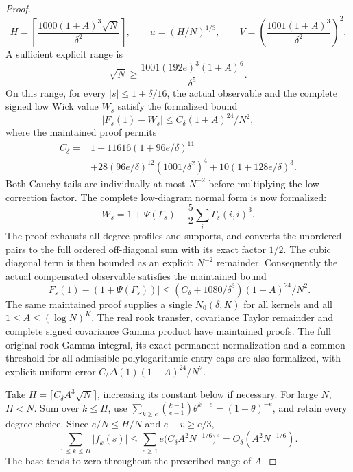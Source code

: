 \begin{proof}
\[ H=\left\lceil\frac{1000(1+A)^3\sqrt N}{\delta^2}\right\rceil,\qquad
 u=(H/N)^{1/3},\qquad
 V=\left(\frac{1001(1+A)^3}{\delta^2}\right)^2.
\]
A sufficient explicit range is
\[
 \sqrt N\ge
 \frac{1001(192e)^3(1+A)^6}{\delta^5}.
\]
On this range, for every \(|s|\le1+\delta/16\), the actual observable
and the complete signed low Wick value \(W_s\) satisfy the formalized bound
\[
 |F_s(1)-W_s|\le C_\delta(1+A)^{24}/N^2,
\]
where the maintained proof permits
\begin{align*}
 C_\delta={}&1+11616(1+96e/\delta)^{11}\\
 &+28(96e/\delta)^{12}(1001/\delta^2)^4
       +10(1+128e/\delta)^3.
\end{align*}
Both Cauchy tails are individually at most \(N^{-2}\) before multiplying
the low-correction factor. The complete low-diagram normal form is now
formalized:
\[
 W_s=1+\Psi(\Gamma_s)-\frac52\sum_i\Gamma_s(i,i)^3.
\]
The proof exhausts all degree profiles and supports, and converts the
unordered pairs to the full ordered off-diagonal sum with its exact
factor \(1/2\). The cubic diagonal term is then bounded as an explicit
\(N^{-2}\) remainder. Consequently the actual compensated observable
satisfies the maintained bound
\[
 |F_s(1)-(1+\Psi(\Gamma_s))|
 \le (C_\delta+1080/\delta^3)(1+A)^{24}/N^2 .
\]
The same maintained proof supplies a single \(N_0(\delta,K)\) for all
kernels and all \(1\le A\le(\log N)^K\). The real rook transfer,
covariance Taylor remainder and complete signed covariance Gamma product
have maintained proofs. The full original-rook Gamma integral, its exact
permanent normalization and a common threshold for all admissible
polylogarithmic entry caps are also formalized, with explicit uniform
error \(C_\delta\Delta(1)(1+A)^{24}/N^2\).

Take \(H=\lceil C_\delta A^3\sqrt N\rceil\), increasing its
constant below if necessary. For large \(N\), \(H<N\).
Sum over \(k\leq H\), use
\(\sum_{k\geq e}\binom{k-1}{e-1}\theta^{k-e}
=(1-\theta)^{-e}\), and retain every degree choice.
Since \(e/N\leq H/N\) and \(e-v\geq e/3\),
\[
 \sum_{1\leq k\leq H}|f_k(s)|
 \leq\sum_{e\geq1}e
       \bigl(C_\delta A^2N^{-1/6}\bigr)^e
 =O_\delta(A^2N^{-1/6}).
\]
The base tends to zero throughout the prescribed range of \(A\).


\end{proof}
